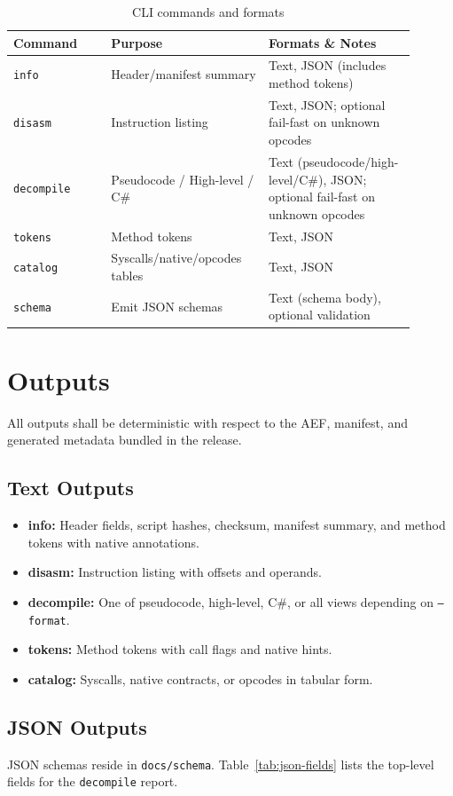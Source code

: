 \documentclass[11pt]{article}
\begin{document}
\begin{table}[h]
\centering
\begin{tabular}{@{}p{0.22\linewidth}p{0.35\linewidth}p{0.33\linewidth}@{}}
\toprule
Command & Purpose & Formats \& Notes \\
\midrule
\texttt{info} & Header/manifest summary & Text, JSON (includes method tokens) \\
\texttt{disasm} & Instruction listing & Text, JSON; optional fail-fast on unknown opcodes \\
\texttt{decompile} & Pseudocode / High-level / C\# & Text (pseudocode/high-level/C\#), JSON; optional fail-fast on unknown opcodes \\
\texttt{tokens} & Method tokens & Text, JSON \\
\texttt{catalog} & Syscalls/native/opcodes tables & Text, JSON \\
\texttt{schema} & Emit JSON schemas & Text (schema body), optional validation \\
\bottomrule
\end{tabular}
\caption{CLI commands and formats}\label{tab:commands}
\end{table}

\section{Outputs}\label{sec:outputs}
All outputs shall be deterministic with respect to the AEF, manifest, and
generated metadata bundled in the release.
\subsection{Text Outputs}
\begin{itemize}[nosep]
    \item \textbf{info:} Header fields, script hashes, checksum, manifest
    summary, and method tokens with native annotations.
    \item \textbf{disasm:} Instruction listing with offsets and operands.
    \item \textbf{decompile:} One of pseudocode, high-level, C\#, or all views
    depending on \texttt{--format}.
    \item \textbf{tokens:} Method tokens with call flags and native hints.
    \item \textbf{catalog:} Syscalls, native contracts, or opcodes in tabular
    form.
\end{itemize}

\subsection{JSON Outputs}
JSON schemas reside in \texttt{docs/schema}. Table~\ref{tab:json-fields} lists
the top-level fields for the \texttt{decompile} report.
\end{document}
